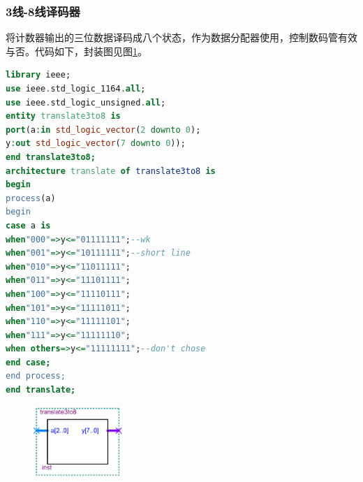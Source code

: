 \documentclass[12pt]{article}
\begin{document}
\subsubsection{3线-8线译码器}将计数器输出的三位数据译码成八个状态，作为数据分配器使用，控制数码管有效与否。代码如下，封装图见图\ref{fig:3t8}。
\begin{lstlisting}[language=VHDL]
library ieee;
use ieee.std_logic_1164.all;
use ieee.std_logic_unsigned.all;
entity translate3to8 is
port(a:in std_logic_vector(2 downto 0);
y:out std_logic_vector(7 downto 0));
end translate3to8;
architecture translate of translate3to8 is
begin
process(a)
begin
case a is
when"000"=>y<="01111111";--wk
when"001"=>y<="10111111";--short line
when"010"=>y<="11011111";
when"011"=>y<="11101111";
when"100"=>y<="11110111";
when"101"=>y<="11111011";
when"110"=>y<="11111101";
when"111"=>y<="11111110";
when others=>y<="11111111";--don't chose
end case;
end process;
end translate;
\end{lstlisting}
\begin{figure}[hp]
	\centering  
	\includegraphics[width=0.3\textwidth]{picture/3t8.png} 
	\caption{}
	\label{fig:3t8}   
\end{figure}
\end{document}
